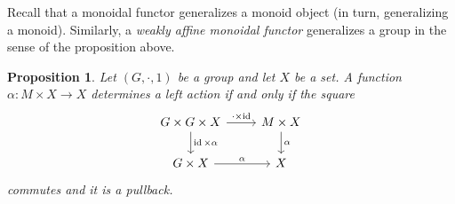 \documentclass[a4paper,UKenglish,numberwithinsect,cleveref, autoref, thm-restate]{lipics-v2021}
\theoremstyle{plain} %
\newtheorem{myproposition}[mytheorem]{Proposition}
\theoremstyle{definition} %
\begin{document}
Recall that a monoidal functor generalizes a monoid object (in turn, generalizing a monoid).
Similarly, a \emph{weakly affine monoidal functor} generalizes a group in the sense of the proposition above.
\begin{myproposition}\label{prop:actio_group_as_pullback}
 Let $(G,\cdot,1)$ be a group and let $X$ be a set. A function $\alpha: M\times X\to X$ determines a left action if and only if the square
 \begin{equation}\label{action}
  \begin{tikzcd}
   G \times G \times X \ar{d}{\id\times\alpha} \ar{r}{\cdot\times\id} & M\times X \ar{d}{\alpha} \\
   G\times X \ar{r}{\alpha} & X
  \end{tikzcd}
 \end{equation}
 commutes and it is a pullback.
\end{myproposition}
\end{document}

